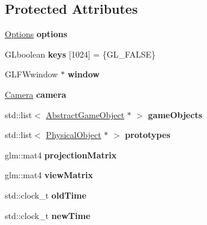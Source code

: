 \subsection*{Protected Attributes}
\begin{DoxyCompactItemize}
\item 
\mbox{\label{class_game_a2235996ff05669aec4bb48996860e67d}} 
\hyperlink{class_options}{Options} {\bfseries options}
\item 
\mbox{\label{class_game_ab231aaefd13094b3dee3dabab5a9e86b}} 
G\+Lboolean {\bfseries keys} \mbox{[}1024\mbox{]} = \{G\+L\+\_\+\+F\+A\+L\+SE\}
\item 
\mbox{\label{class_game_ad9bc7cf39168a1ceaf77d6177116aa94}} 
G\+L\+F\+Wwindow $\ast$ {\bfseries window}
\item 
\mbox{\label{class_game_ae4d989a819d4bf47d01fd3f07713c771}} 
\hyperlink{class_camera}{Camera} {\bfseries camera}
\item 
\mbox{\label{class_game_aa2605b1636b4b5651690a725fb4b47b8}} 
std\+::list$<$ \hyperlink{class_abstract_game_object}{Abstract\+Game\+Object} $\ast$ $>$ {\bfseries game\+Objects}
\item 
\mbox{\label{class_game_a6e1a1580e965d09a74419818478ead36}} 
std\+::list$<$ \hyperlink{class_physical_object}{Physical\+Object} $\ast$ $>$ {\bfseries prototypes}
\item 
\mbox{\label{class_game_ab9bc5114249bcda8a7e4322a1c3116f8}} 
glm\+::mat4 {\bfseries projection\+Matrix}
\item 
\mbox{\label{class_game_a335cb05b6472b0fb871614a635be2273}} 
glm\+::mat4 {\bfseries view\+Matrix}
\item 
\mbox{\label{class_game_abdb6d017ddb8710e60974423163bd537}} 
std\+::clock\+\_\+t {\bfseries old\+Time}
\item 
\mbox{\label{class_game_ae0225baf4086dcdffec5d38e35c091f4}} 
std\+::clock\+\_\+t {\bfseries new\+Time}
\item 
\mbox{\label{class_game_a96c8e603187b7e91bc0a75193f5ed939}} 

\end{DoxyCompactItemize}
